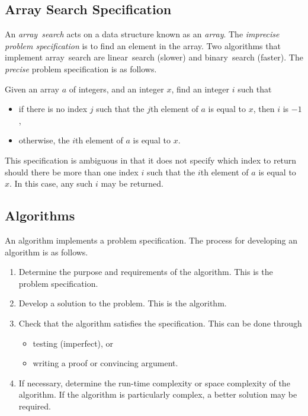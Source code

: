 \subsection{Array Search Specification}

An \emph{array~search} acts on a data structure known as an \emph{array}.
The \emph{imprecise} \emph{problem specification} is to find an element in the array.
Two algorithms that implement array~search are linear~search (slower) and binary~search (faster).
The \emph{precise} problem specification is as follows.

Given an array \( a \) of integers, and an integer \( x \), find an integer \( i \) such that
\begin{itemize}
  \item if there is no index \( j \) such that the \( j \)th element of \( a \) is equal to \( x \), then \( i \) is \( -1 \),
  \item otherwise, the \( i \)th element of \( a \) is equal to \( x \).
\end{itemize}

This specification is ambiguous in that it does not specify which index to return should there be more than one index \( i \) such that the \( i \)th element of \( a \) is equal to \( x \).
In this case, any such \( i \) may be returned.

\subsection{Algorithms}

An algorithm implements a problem specification.
The process for developing an algorithm is as follows.
\begin{enumerate}
  \item Determine the purpose and requirements of the algorithm.
  This is the problem specification.
  \item Develop a solution to the problem.
  This is the algorithm.
  \item Check that the algorithm satisfies the specification.
  This can be done through
  \begin{itemize}
    \item testing (imperfect), or
    \item writing a proof or convincing argument.
  \end{itemize}
  \item If necessary, determine the run-time complexity or space complexity of the algorithm.
  If the algorithm is particularly complex, a better solution may be required.
\end{enumerate}

